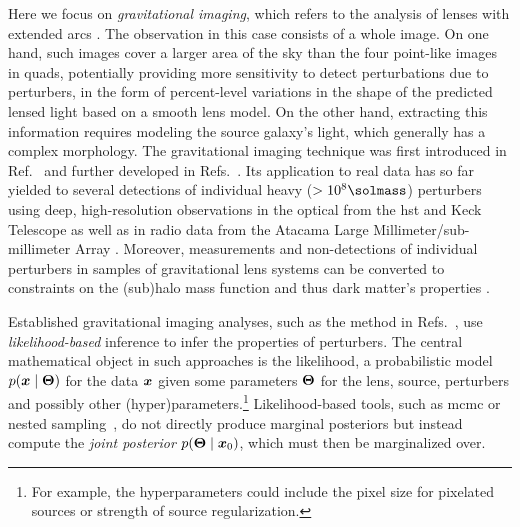 Here we focus on \emph{gravitational imaging}, which refers to the analysis of lenses with extended arcs \cite{Koopmans:2005ig,Vegetti:2008eg,Vegetti:2009gw}. The observation in this case consists of a whole image. On one hand, such images cover a larger area of the sky than the four point-like images in quads, potentially providing more sensitivity to detect perturbations due to perturbers, in the form of percent-level variations in the shape of the predicted lensed light based on a smooth lens model. On the other hand, extracting this information requires modeling the source galaxy's light, which generally has a complex morphology. The gravitational imaging technique was first introduced in Ref.~\cite{Koopmans:2005nr} and further developed in Refs.~\cite{Vegetti:2008eg, Vegetti:2009gw}. Its application to real data has so far yielded to several detections of individual heavy ($>10^8 \si{\solmass}$) perturbers using deep, high-resolution observations in the optical from the \gls*{hst} and Keck Telescope as well as in radio data from the Atacama Large Millimeter/sub-millimeter Array \cite{Vegetti:2010wa, Vegetti:2009cz, Vegetti:2012mc, Hezaveh:2016ltk,Diego:2022mii}. Moreover, measurements and non-detections of individual perturbers in samples of gravitational lens systems can be converted to constraints on the (sub)halo mass function and thus dark matter's properties \cite{Vegetti:2014lqa, Vegetti:2018dly,Ritondale:2018cvp}. 

Established gravitational imaging analyses, such as the method in Refs.~\cite{Vegetti:2008eg,Hezaveh:2016ltk}, use \emph{likelihood-based} inference to infer the properties of perturbers. The central mathematical object in such approaches is the likelihood, a probabilistic model $p(\bm{x} \mid \bm{\Theta})$ for the data $\bm{x}$ given some parameters $\bm{\Theta}$ for the lens, source, perturbers and possibly other (hyper)parameters.\footnote{For example, the hyperparameters could include the pixel size for pixelated sources or strength of source regularization.}   
Likelihood-based tools, such as \gls*{mcmc} or nested sampling~\cite{Skilling:2004pqw}, do not directly produce marginal posteriors but instead compute the \emph{joint posterior} $p(\bm{\Theta} \mid \bm{x}_0)$, which must then be marginalized over. 

